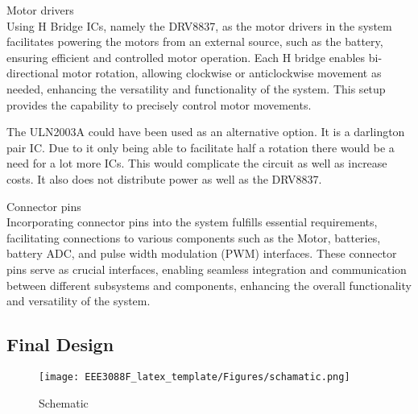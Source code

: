 \documentclass[class=report,11pt,crop=false]{standalone}
\begin{document}
\tabitem Motor drivers\\

Using H Bridge ICs, namely the DRV8837, as the motor drivers in the system facilitates powering the motors from an external source, such as the battery, ensuring efficient and controlled motor operation. Each H bridge enables bi-directional motor rotation, allowing clockwise or anticlockwise movement as needed, enhancing the versatility and functionality of the system. This setup provides the capability to precisely control motor movements. 

The ULN2003A could have been used as an alternative option. It is a darlington pair IC. Due to it only being able to facilitate half a rotation there would be a need for a lot more ICs. This would complicate the circuit as well as increase costs. It also does not distribute power as well as the DRV8837.

\tabitem Connector pins\\


Incorporating connector pins into the system fulfills essential requirements, facilitating connections to various components such as the Motor, batteries, battery ADC, and pulse width modulation (PWM) interfaces. These connector pins serve as crucial interfaces, enabling seamless integration and communication between different subsystems and components, enhancing the overall functionality and versatility of the system.

\subsection{Final Design}

\begin{figure}[h]
    \centering
    \texttt{[image: EEE3088F\_latex\_template/Figures/schamatic.png]}
    \caption{Schematic}
    \label{fig:schematic}
\end{figure}
\end{document}
